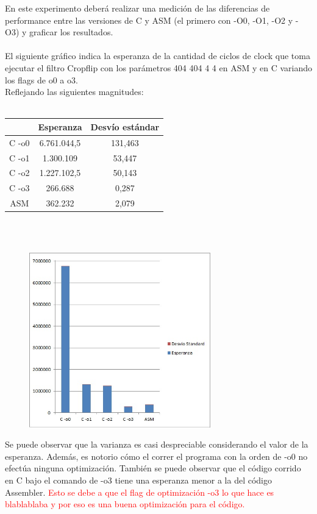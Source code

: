 En este experimento deberá realizar una medición de las diferencias de 
performance entre las versiones de C y ASM (el primero con -O0, -O1, -O2 y -O3) 
y graficar los resultados. \\
\\
El siguiente gr\'afico indica la esperanza de la cantidad de ciclos de clock que toma ejecutar el filtro Cropflip con los par\'ametros 404 404 4 4 en ASM y en C variando los flags de o0 a o3. \\
Reflejando las siguientes magnitudes: \\
\\
 \begin{tabular}[c]{|c|c|c|}
	\hline
		 & Esperanza & Desv\'io est\'andar\\
		\hline
C -o0 & 6.761.044,5 & 131,463 \\
\hline
C -o1 & 1.300.109 & 53,447 \\
\hline
C -o2 & 1.227.102,5 & 50,143\\
\hline
C -o3 & 266.688 & 0,287 \\
\hline
ASM & 362.232 & 2,079\\
\hline
	\end{tabular}\\\\

\begin{figure}[h!]
  \begin{center}
	\includegraphics[width=0.7\textwidth]{imagenes/14.jpg}
  \end{center}
\end{figure}


Se puede observar que la varianza es casi despreciable considerando el valor de la esperanza. Adem\'as, es notorio c\'omo el correr el programa con la orden de -o0 no efect\'ua ninguna optimizaci\'on. Tambi\'en se puede observar que el c\'odigo corrido en C bajo el comando de -o3 tiene una esperanza menor a la del c\'odigo Assembler. \textcolor{red}{Esto se debe a que el flag de optimizaci\'on -o3 lo que hace es blablablaba y por eso es una buena optimizaci\'on para el c\'odigo.}

